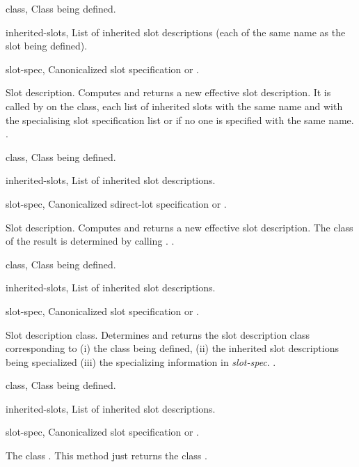 \begin{optDefinition}
%
\begin{genericargs}
    \item[class, \classref{class}] Class being defined.
    \item[inherited-slots, \classref{list}] List of inherited slot descriptions
    (each of the same name as the slot being defined).
    \item[slot-spec, \classref{list}] Canonicalized slot specification or
    \nil{}.
\end{genericargs}
%
\result%
Slot description.
%
\remarks%
Computes and returns a new effective slot description. It is called by
 on the class, each list of inherited
slots with the same name and with the specialising slot specification
list or \nil{}\/ if no one is specified with the same name.
%
\seealso%
.

%
\begin{specargs}
    \item[class, \classref{class}] Class being defined.
    \item[inherited-slots, \classref{list}] List of inherited slot descriptions.
    \item[slot-spec, \classref{list}] Canonicalized sdirect-lot specification or
    \nil{}.
\end{specargs}
%
\result%
Slot description.
%
\remarks%
Computes and returns a new effective slot description.  The class of the result
is determined by calling
.
%
\seealso%
.

%
\begin{genericargs}
    \item[class, \classref{class}] Class being defined.
    \item[inherited-slots, \classref{list}] List of inherited slot descriptions.
    \item[slot-spec, \classref{list}] Canonicalized slot specification or
    \nil{}.
\end{genericargs}
%
\result%
Slot description class.
%
\remarks%
Determines and returns the slot description class corresponding to (i)
the class being defined, (ii) the inherited slot descriptions being
specialized (iii) the specializing information in {\em slot-spec}.
%
\seealso%
.

%
\begin{specargs}
    \item[class, \classref{class}] Class being defined.
    \item[inherited-slots, \classref{list}] List of inherited slot
    descriptions.
    \item[slot-spec, \classref{list}] Canonicalized slot specification or
    \nil{}.
\end{specargs}
%
\result%
The class .
%
\remarks%
This method just returns the class .
%
\end{optDefinition}

